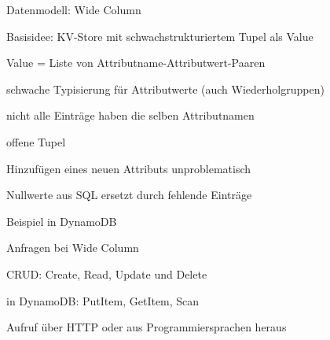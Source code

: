 \documentclass[a4paper]{article}
\begin{document}
\begin{multicols}{3}
\begin{itemize*}
        Datenmodell: Wide Column
        \begin{itemize*}
            \item Basisidee: KV-Store mit schwachstrukturiertem Tupel als Value
            \item Value = Liste von Attributname-Attributwert-Paaren
            \begin{itemize*}
                \item schwache Typisierung für Attributwerte (auch Wiederholgruppen)
            \end{itemize*}
            \item nicht alle Einträge haben die selben Attributnamen
            \begin{itemize*}
                \item offene Tupel
                \item Hinzufügen eines neuen Attributs unproblematisch
                \item Nullwerte aus SQL ersetzt durch fehlende Einträge
            \end{itemize*}
            \item Beispiel in DynamoDB
            \item Anfragen bei Wide Column
            \begin{itemize*}
                \item CRUD: Create, Read, Update und Delete
                \item in DynamoDB: PutItem, GetItem, Scan
                \item Aufruf über HTTP oder aus Programmiersprachen heraus
            \end{itemize*}
        \end{itemize*}



\end{itemize*}
\end{multicols}
\end{document}
